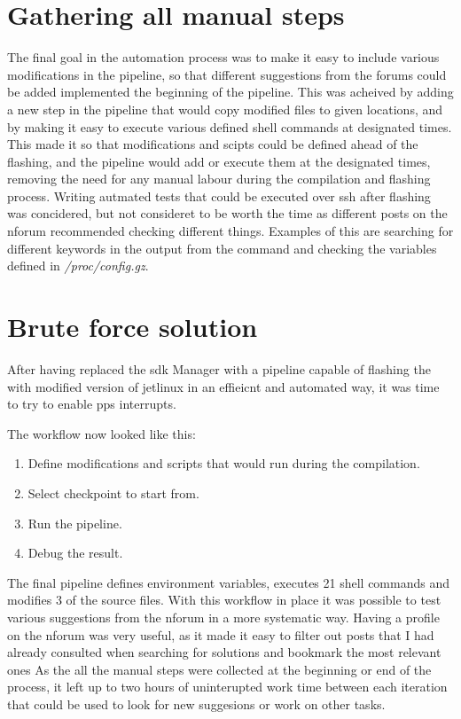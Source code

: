 \section{Gathering all manual steps}
The final goal in the automation process was to make it easy to include various modifications in the pipeline, so that different suggestions from the forums could be added implemented the beginning of the pipeline.
This was acheived by adding a new step in the pipeline that would copy modified files to given locations, and by making it easy to execute various defined shell commands at designated times.
This made it so that modifications and scipts could be defined ahead of the flashing, and the pipeline would add or execute them at the designated times, removing the need for any manual labour during the compilation and flashing process.
Writing autmated tests that could be executed over \gls{ssh} after flashing was concidered, but not consideret to be worth the time as different posts on the \gls{nforum} recommended checking different things.
Examples of this are searching for different keywords in the output from the  command and checking the variables defined in \textit{/proc/config.gz}.

\section{Brute force solution}
After having replaced the \gls{sdk} Manager with a pipeline capable of flashing the \jx with modified version of
\gls{jetlinux} in an effieicnt and automated way, it was time to try to enable \gls{pps} interrupts.

The workflow now looked like this:
\begin{enumerate}
    \item Define modifications and scripts that would run during the compilation.
    \item Select checkpoint to start from.
    \item Run the pipeline.
    \item Debug the result.
\end{enumerate}

The final pipeline defines environment variables, executes 21 shell commands and modifies 3 of the source files.
With this workflow in place it was possible to test various suggestions from the \gls{nforum} in a more systematic way.
Having a profile on the \gls{nforum} was very useful, as it made it easy to filter out posts that I had already consulted when searching for solutions and bookmark the most relevant ones \cite{nvidiaNvidiaForumExtended2023}
As the all the manual steps were collected at the beginning or end of the process, it left up to two hours of uninterupted work time between each iteration that could be used to look for new suggesions or work on other tasks.


